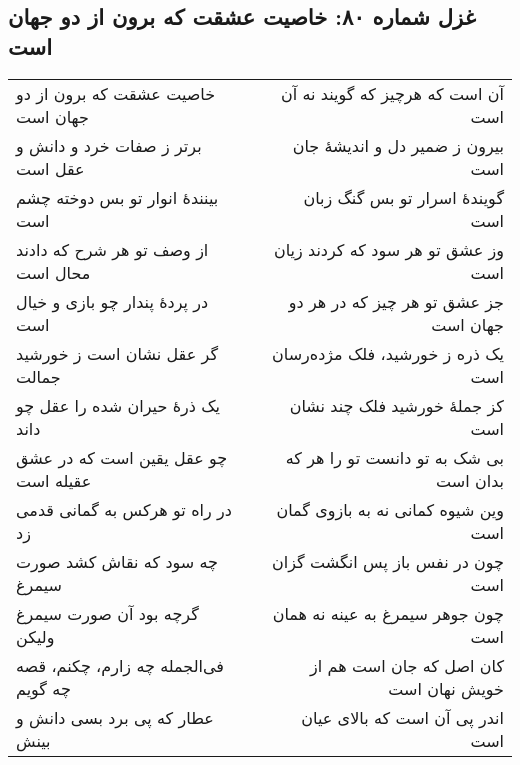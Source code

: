 \begin{center}
\section*{غزل شماره ۸۰: خاصیت عشقت که برون از دو جهان است}
\label{sec:080}
\begin{longtable}{l p{0.5cm} r}
خاصیت عشقت که برون از دو جهان است
&&
آن است که هرچیز که گویند نه آن است
\\
برتر ز صفات خرد و دانش و عقل است
&&
بیرون ز ضمیر دل و اندیشهٔ جان است
\\
بینندهٔ انوار تو بس دوخته چشم است
&&
گویندهٔ اسرار تو بس گنگ زبان است
\\
از وصف تو هر شرح که دادند محال است
&&
وز عشق تو هر سود که کردند زیان است
\\
در پردهٔ پندار چو بازی و خیال است
&&
جز عشق تو هر چیز که در هر دو جهان است
\\
گر عقل نشان است ز خورشید جمالت
&&
یک ذره ز خورشید، فلک مژده‌رسان است
\\
یک ذرهٔ حیران شده را عقل چو داند
&&
کز جملهٔ خورشید فلک چند نشان است
\\
چو عقل یقین است که در عشق عقیله است
&&
بی شک به تو دانست تو را هر که بدان است
\\
در راه تو هرکس به گمانی قدمی زد
&&
وین شیوه کمانی نه به بازوی گمان است
\\
چه سود که نقاش کشد صورت سیمرغ
&&
چون در نفس باز پس انگشت گزان است
\\
گرچه بود آن صورت سیمرغ ولیکن
&&
چون جوهر سیمرغ به عینه نه همان است
\\
فی‌الجمله چه زارم، چکنم، قصه چه گویم
&&
کان اصل که جان است هم از خویش نهان است
\\
عطار که پی برد بسی دانش و بینش
&&
اندر پی آن است که بالای عیان است
\\
\end{longtable}
\end{center}
